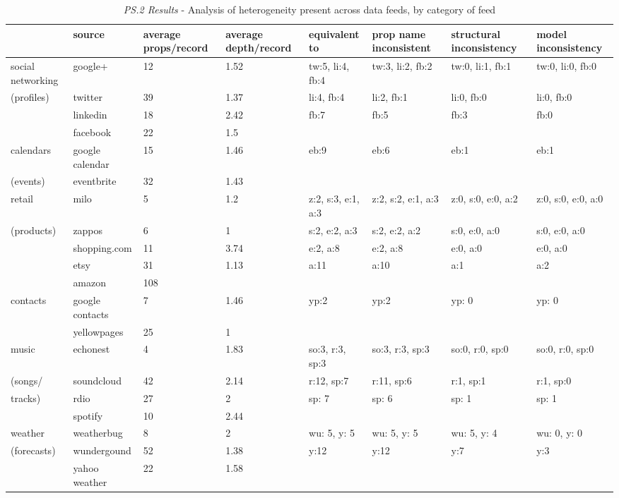 \documentclass{sigchi}
\begin{document}
\begin{table}
\small
\begin{tabular}{| p{2.0cm} | p{1.8cm} | p{1.8cm} | p{1.8cm} | p{1.8cm} | p{1.8cm} | p{1.8cm} | p{1.8cm} |}
\hline
				& {\bf source}		& {\bf average props/record}	& {\bf average depth/record}	& {\bf equivalent to}	& {\bf prop name inconsistent}	& {\bf structural inconsistency} 	& {\bf model inconsistency} \\
\hline
social networking	& google+			& 12						& 1.52					& tw:5, li:4, fb:4		& tw:3, li:2, fb:2				& tw:0, li:1, fb:1				& tw:0, li:0, fb:0 \\
(profiles)			& twitter			& 39						& 1.37					& li:4, fb:4 			& li:2, fb:1					& li:0, fb:0					& li:0, fb:0 \\
				& linkedin			& 18						& 2.42					& fb:7			& fb:5					& fb:3					& fb:0 \\
				& facebook		& 22						& 1.5						&				&						&						& \\
\hline
calendars			& google calendar	& 15						& 1.46					& eb:9			& eb:6					& eb:1					& eb:1 \\
(events)			& eventbrite		& 32						& 1.43					&				&						& 						& \\
\hline
retail				& milo			& 5						& 1.2						& z:2, s:3, e:1, a:3	& z:2, s:2, e:1, a:3			& z:0, s:0, e:0, a:2			& z:0, s:0, e:0, a:0 \\
(products)			& zappos			& 6						& 1						& s:2, e:2, a:3		& s:2, e:2, a:2				& s:0, e:0, a:0				& s:0, e:0, a:0 \\
				& shopping.com	& 11						& 3.74					& e:2, a:8			& e:2, a:8					& e:0, a:0					& e:0, a:0 \\
				& etsy			& 31						& 1.13					& a:11			& a:10					& a:1						& a:2 \\
				& amazon			& 108					&						&				& 						&						& \\
\hline
contacts			& google contacts	& 7						& 1.46					& yp:2			& yp:2					& yp: 0					& yp: 0 \\
				& yellowpages		& 25						& 1						&				&						&						& \\
\hline
music			& echonest		& 4						& 1.83					& so:3, r:3, sp:3		& so:3, r:3, sp:3				& so:0, r:0, sp:0				& so:0, r:0, sp:0 \\
(songs/			& soundcloud		& 42						& 2.14					& r:12, sp:7		& r:11, sp:6 				& r:1, sp:1					& r:1, sp:0 \\
tracks)			& rdio			& 27						& 2						& sp: 7			& sp: 6					& sp: 1					& sp: 1 \\
				& spotify			& 10						& 2.44					&				&						&						& \\
\hline
weather			& weatherbug		& 8						& 2						& wu: 5, y: 5		& wu: 5, y: 5				& wu: 5, y: 4				& wu: 0, y: 0 \\
(forecasts)		& wundergound	& 52						& 1.38					& y:12			& y:12					& y:7						& y:3 \\
				& yahoo weather	& 22						& 1.58					&				&						&						& \\
\hline
\end{tabular}
\caption{\emph{PS.2 Results} - Analysis of heterogeneity present across data feeds, by category of feed}\label{tbl:prestudy2}
\end{table}
\end{document}
